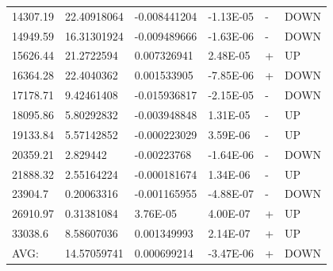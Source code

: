 \documentclass{article}
\begin{document}
\begin{table}
\begin{tabular}{@{}llllll@{}}
14307.19     & 22.40918064      & -0.008441204     & -1.13E-05 & -    & DOWN    \\
14949.59     & 16.31301924      & -0.009489666     & -1.63E-06 & -    & DOWN    \\
15626.44     & 21.2722594       & 0.007326941      & 2.48E-05  & +    & UP      \\
16364.28     & 22.4040362       & 0.001533905      & -7.85E-06 & +    & DOWN    \\
17178.71     & 9.42461408       & -0.015936817     & -2.15E-05 & -    & DOWN    \\
18095.86     & 5.80292832       & -0.003948848     & 1.31E-05  & -    & UP      \\
19133.84     & 5.57142852       & -0.000223029     & 3.59E-06  & -    & UP      \\
20359.21     & 2.829442         & -0.00223768      & -1.64E-06 & -    & DOWN    \\
21888.32     & 2.55164224       & -0.000181674     & 1.34E-06  & -    & UP      \\
23904.7      & 0.20063316       & -0.001165955     & -4.88E-07 & -    & DOWN    \\
26910.97     & 0.31381084       & 3.76E-05         & 4.00E-07  & +    & UP      \\
33038.6      & 8.58607036       & 0.001349993      & 2.14E-07  & +    & UP      \\
AVG:         & 14.57059741      & 0.000699214      & -3.47E-06 & +    & DOWN    \\ \bottomrule
\end{tabular}
\end{table}
\end{document}

